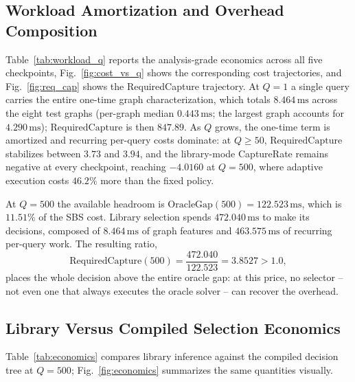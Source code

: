\documentclass[conference]{IEEEtran}
\begin{document}
\subsection{Workload Amortization and Overhead Composition}
Table~\ref{tab:workload_q} reports the analysis-grade economics across all five checkpoints, Fig.~\ref{fig:cost_vs_q} shows the corresponding cost trajectories, and Fig.~\ref{fig:req_cap} shows the RequiredCapture trajectory. At $Q=1$ a single query carries the entire one-time graph characterization, which totals $8.464\,\mathrm{ms}$ across the eight test graphs (per-graph median $0.443\,\mathrm{ms}$; the largest graph accounts for $4.290\,\mathrm{ms}$); $\mathrm{RequiredCapture}$ is then $847.89$. As $Q$ grows, the one-time term is amortized and recurring per-query costs dominate: at $Q\geq50$, $\mathrm{RequiredCapture}$ stabilizes between $3.73$ and $3.94$, and the library-mode CaptureRate remains negative at every checkpoint, reaching $-4.0160$ at $Q=500$, where adaptive execution costs $46.2\%$ more than the fixed policy.

At $Q=500$ the available headroom is $\mathrm{OracleGap}(500)=122.523\,\mathrm{ms}$, which is $11.51\%$ of the SBS cost. Library selection spends $472.040\,\mathrm{ms}$ to make its decisions, composed of $8.464\,\mathrm{ms}$ of graph features and $463.575\,\mathrm{ms}$ of recurring per-query work. The resulting ratio,
\begin{equation}
\mathrm{RequiredCapture}(500) = \frac{472.040}{122.523} = 3.8527 > 1.0,
\end{equation}
places the whole decision above the entire oracle gap: at this price, no selector -- not even one that always executes the oracle solver -- can recover the overhead.

\subsection{Library Versus Compiled Selection Economics}
\label{sec:d}
Table~\ref{tab:economics} compares library inference against the compiled decision tree at $Q=500$; Fig.~\ref{fig:economics} summarizes the same quantities visually.
\end{document}
